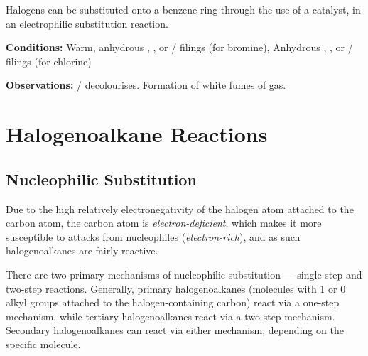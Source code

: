 			Halogens can be substituted onto a benzene ring through the use of a catalyst, in an electrophilic substitution reaction.

			\vspace{1.5em}
			\vbox{\textbf{Conditions:}	\tabto{35mm}Warm, anhydrous , , or  /
										\ch{\aluminium} filings (for bromine),
										\tabto{35mm}Anhydrous , , or
													 / \ch{\aluminium} filings (for chlorine)}

			\vspace{0.75em}
			\vbox{\textbf{Observations:}\tabto{35mm}  /
										  decolourises.
										\tabto{35mm}Formation of white fumes of  gas.}


	\pagebreak
	\section{Halogenoalkane Reactions}

		\subsection{Nucleophilic Substitution}

			Due to the high relatively electronegativity of the halogen atom attached to the carbon atom, the carbon atom is
			\textit{electron-deficient}, which makes it more susceptible to attacks from nucleophiles (\textit{electron-rich}), and
			as such halogenoalkanes are fairly reactive.

			There are two primary mechanisms of nucleophilic substitution –– single-step and two-step reactions. Generally, primary
			halogenoalkanes (molecules with 1 or 0 alkyl groups attached to the halogen-containing carbon) react via a one-step
			mechanism, while tertiary halogenoalkanes react via a two-step mechanism. Secondary halogenoalkanes can react via either
			mechanism, depending on the specific molecule.

